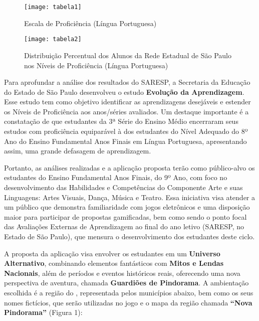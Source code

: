 \begin{figure}[!h]
    \centering
    \caption{ Escala de Proficiência (Língua Portuguesa) }%
    \label{fig:tabela2}
    \texttt{[image: tabela1]}
    \end{figure}
 
    \begin{figure}[!h]
        \centering
        \caption{ Distribuição Percentual dos Alunos da Rede Estadual de São Paulo nos Níveis de Proficiência (Língua Portuguesa) }%
        \label{fig:tabela2}
        \texttt{[image: tabela2]}
        \end{figure}

Para aprofundar a análise dos resultados do SARESP, a Secretaria da Educação do Estado de São Paulo desenvolveu o estudo \textbf{Evolução da Aprendizagem}. Esse estudo tem como objetivo identificar as aprendizagens desejáveis e estender os Níveis de Proficiência aos anos/séries avaliados. Um destaque importante é a constatação de que estudantes da 3ª Série do Ensino Médio encerraram seus estudos com proficiência equiparável à dos estudantes do Nível Adequado do 8º Ano do Ensino Fundamental Anos Finais em Língua Portuguesa, apresentando assim, uma grande defasagem de aprendizagem. 

Portanto, as análises realizadas e a aplicação proposta terão como público-alvo os estudantes do Ensino Fundamental Anos Finais, do 9º Ano, com foco no desenvolvimento das Habilidades e Competências do Componente Arte e suas Linguagens: Artes Visuais, Dança, Música e Teatro. Essa iniciativa visa atender a um público que demonstra familiaridade com jogos eletrônicos e uma disposição maior para participar de propostas gamificadas, bem como sendo o ponto focal das Avaliações Externas de Aprendizagem ao final do ano letivo (SARESP, no Estado de São Paulo), que mensura o desenvolvimento dos estudantes deste ciclo. 

A proposta da aplicação visa envolver os estudantes em um \textbf{Universo Alternativo}, combinando elementos fantásticos com \textbf{Mitos e Lendas Nacionais}, além de períodos e eventos históricos reais, oferecendo uma nova perspectiva de aventura, chamada \textbf{Guardiões de Pindorama}. A ambientação escolhida é a região do , representada pelos municípios abaixo, bem como os seus nomes fictícios, que serão utilizadas no jogo e o mapa da região chamada \textbf{“Nova Pindorama”} (Figura 1): 

